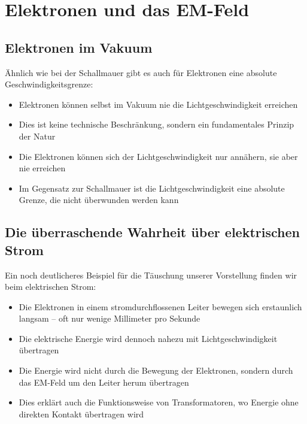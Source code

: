 \documentclass[12pt,a4paper]{article}
\begin{document}
	\section{Elektronen und das EM-Feld}
	\subsection{Elektronen im Vakuum}
	Ähnlich wie bei der Schallmauer gibt es auch für Elektronen eine absolute Geschwindigkeitsgrenze:
	\begin{itemize}
		\item Elektronen können selbst im Vakuum nie die Lichtgeschwindigkeit erreichen
		\item Dies ist keine technische Beschränkung, sondern ein fundamentales Prinzip der Natur
		\item Die Elektronen können sich der Lichtgeschwindigkeit nur annähern, sie aber nie erreichen
		\item Im Gegensatz zur Schallmauer ist die Lichtgeschwindigkeit eine absolute Grenze, die nicht überwunden werden kann
	\end{itemize}
	
	\subsection{Die überraschende Wahrheit über elektrischen Strom}
	Ein noch deutlicheres Beispiel für die Täuschung unserer Vorstellung finden wir beim elektrischen Strom:
	\begin{itemize}
		\item Die Elektronen in einem stromdurchflossenen Leiter bewegen sich erstaunlich langsam -- oft nur wenige Millimeter pro Sekunde
		\item Die elektrische Energie wird dennoch nahezu mit Lichtgeschwindigkeit übertragen
		\item Die Energie wird nicht durch die Bewegung der Elektronen, sondern durch das EM-Feld um den Leiter herum übertragen
		\item Dies erklärt auch die Funktionsweise von Transformatoren, wo Energie ohne direkten Kontakt übertragen wird
	\end{itemize}
	
\end{document}
